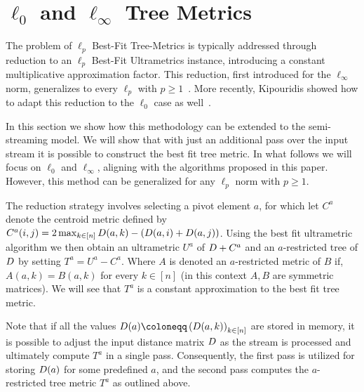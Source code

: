 \documentclass{article}
\begin{document}
\twopass*

\section{\texorpdfstring{$\ell_0$ and $\ell_\infty$ Tree Metrics}{l-0 and l-inf Tree Metrics}} \label{section:trees}
\newcommand{\apivot}{a}
\newcommand{\centroid}{C^\apivot}
\newcommand{\zeronorm}[1]{\lVert #1 \rVert_0}

The problem of $\ell_p$ Best-Fit Tree-Metrics is typically addressed through reduction to an $\ell_p$ Best-Fit Ultrametrics instance, introducing a constant multiplicative approximation factor. This reduction, first introduced for the $\ell_\infty$ norm, generalizes to every $\ell_p$ with $p \geq 1$~\cite{agarwala}.
More recently, Kipouridis showed how to adapt this reduction to the $\ell_0$ case as well~\cite{kipouridis2023fitting}.

In this section we show how this methodology can be extended to the semi-streaming model. We will show that with just an additional pass over the input stream it is possible to construct the best fit tree metric. 
In what follows we will focus on $\ell_0$ and $\ell_\infty$, aligning with the algorithms proposed in this paper. However, this method can be generalized for any $\ell_p$ norm with $p \geq 1$.

The reduction strategy involves selecting a pivot element $\apivot$, for which let $\centroid$ denote the centroid metric defined by $\centroid (i,j) = 2\max_{k \in [n]}\inputmatrix (\apivot,k) - (\inputmatrix (\apivot,i) + \inputmatrix (\apivot,j))$. Using the best fit ultrametric algorithm we then obtain an ultrametric $U^\apivot$ of $\inputmatrix + \centroid$ and an $\apivot$-restricted tree of $D$ by setting $T^\apivot = U^\apivot - \centroid$.
Where $A$ is denoted an $\apivot$-restricted metric of $B$ if, $A (\apivot,k)=B (\apivot,k)$ for every $k \in [n]$ (in this context $A,B$ are symmetric matrices). We will see that $T^\apivot$ is a constant approximation to the best fit tree metric.

Note that if all the values $\inputmatrix(\apivot) \coloneqq \left(\inputmatrix (\apivot,k) \right)_{k \in [n]}$ are stored in memory, it is possible to adjust the input distance matrix $D$ as the stream is processed and ultimately compute $T^\apivot$ in a single pass. Consequently, the first pass is utilized for storing $\inputmatrix (\apivot)$ for some predefined $\apivot$, and the second pass computes the $\apivot$-restricted tree metric $T^\apivot$ as outlined above.
\end{document}
